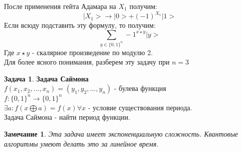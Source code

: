 \documentclass{beamer}
\theoremstyle{plain}
\newtheorem{rmk}[thm]{Замечание}
\theoremstyle{definition}
\newtheorem{prob-rus}[thm]{Задача}
\begin{document}
\begin{frame}
    После применения гейта Адамара на $X_1$ получим: $$ |X_1> \rightarrow |0> + (-1)^{X_1} | 1> $$
    Если всюду подставить эту формулу, то получим: $$ \sum_{y \in \{0, 1\}^n} -1^{x \star y} | y> $$
    Где $x \star y$ - скалярное произведение по модулю 2. \\
    Для более ясного понимания, разберем эту задачу при $ n = 3 $
\end{frame}


\begin{frame}
    \begin{prob-rus}
        \textbf{Задача Саймона}\\
        $f(x_1, x_2, ... , x_n) = (y_1, y_2, ... , y_n) $ - булева функция \\
        $f: \{0,1\}^n \rightarrow \{0,1\}^n$ \\
        $\exists a : f(x \bigoplus a) = f(x) \forall x$ - условие существования периода. \\
        Задача Саймона - найти период функции.
    \end{prob-rus}
    \begin{rmk}
        Эта задача имеет экспоненциальную сложность. Квантовые алгоритмы умеют делать это за линейное время.
    \end{rmk}
\end{frame}
\end{document}
